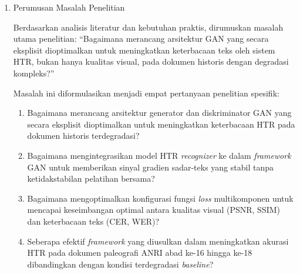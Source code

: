\documentclass[12pt,a4paper]{article}
\begin{document}
\begin{enumerate}[label=\arabic*., leftmargin=*, nosep]
\begin{enumerate}[label=(\alph*), leftmargin=*, nosep]
\item Kesenjangan Arsitektural---Evaluasi Single-Modal: Diskriminator yang ada hanya mengevaluasi kualitas visual (single-modal CNN), tanpa eksplorasi arsitektur dual-modal yang dapat menangkap koherensi tekstual melalui jalur sekuensial (LSTM). Meskipun kontribusi empirisnya perlu divalidasi, eksplorasi ini penting untuk melengkapi pemahaman teoretis tentang evaluasi bilateral visual-tekstual dalam konteks GAN berorientasi HTR.

\item \textit{Kesenjangan Evaluasi---Optimasi Loss Function:} Tidak ada studi ablasi sistematis yang mengidentifikasi konfigurasi optimal untuk menyeimbangkan komponen funfsi loss (piksel, \textit{adversarial}, perseptual, CTC) guna mencapai keseimbangan Pareto antara kualitas visual dan keterbacaan HTR.
\end{enumerate}

\item Perumusan Masalah Penelitian

Berdasarkan analisis literatur dan kebutuhan praktis, dirumuskan masalah utama penelitian: ``Bagaimana merancang arsitektur GAN yang secara eksplisit dioptimalkan untuk meningkatkan keterbacaan teks oleh sistem HTR, bukan hanya kualitas visual, pada dokumen historis dengan degradasi kompleks?''

Masalah ini diformulasikan menjadi empat pertanyaan penelitian spesifik:

\begin{enumerate}[label=RQ\arabic*:, leftmargin=*, nosep]
\item Bagaimana merancang arsitektur generator dan diskriminator GAN yang secara eksplisit dioptimalkan untuk meningkatkan keterbacaan HTR pada dokumen historis terdegradasi?

\item Bagaimana mengintegrasikan model HTR \textit{recognizer} ke dalam \textit{framework} GAN untuk memberikan sinyal gradien sadar-teks yang stabil tanpa ketidakstabilan pelatihan bersama?

\item Bagaimana mengoptimalkan konfigurasi fungsi \textit{loss} multikomponen untuk mencapai keseimbangan optimal antara kualitas visual (PSNR, SSIM) dan keterbacaan teks (CER, WER)?

\item Seberapa efektif \textit{framework} yang diusulkan dalam meningkatkan akurasi HTR pada dokumen paleografi ANRI abad ke-16 hingga ke-18 dibandingkan dengan kondisi terdegradasi \textit{baseline}?
\end{enumerate}
\end{enumerate}
\end{document}
